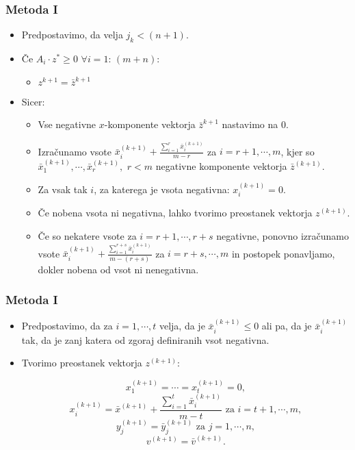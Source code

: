 \documentclass{beamer}
\theoremstyle{definition}
\theoremstyle{plain}
\begin{document}
\begin{frame}
\frametitle{Metoda I}
     \begin{itemize}
        \item Predpostavimo, da velja  $j_k < (n +1)$.
        \item Če $A_i \cdot z^* \geq 0 \, \, \forall i = 1: \, (m+n)$:
        \begin{itemize}
            \item $z^{k+1} = \bar{z}^{k+1}$
        \end{itemize}
        \item Sicer:
        \begin{itemize}
           \item Vse negativne $x$-komponente vektorja $\bar{z}^{k+1}$ nastavimo na 0.
           \item Izračunamo vsote  $\bar{x}_i^{(k+1)} + \frac{\sum_{i=1}^r \bar{x}_i^{(k+1)}}{m - r} $ za $i = r +1, \cdots, m$, kjer 
           so $\bar{x}_1^{(k+1)}, \cdots, \bar{x}_r^{(k+1)}, \, \, r < m$ negativne komponente vektorja $\bar{z}^{(k+1)}$.
           \item Za vsak tak $i$, za katerega
           je vsota negativna: $x_i^{(k+1)} = 0$.
           \item Če nobena vsota ni negativna, lahko tvorimo preostanek vektorja $z^{(k+1)}$.
           \item Če so nekatere vsote za $i = r+1, \cdots, r +s$ negativne, ponovno izračunamo vsote 
           $\bar{x}_i^{(k+1)} + \frac{\sum_{i=1}^{r+s} \bar{x}_i^{(k+1)}}{m - (r+s)} $ za $i = r + s, \cdots, m$ in postopek ponavljamo, dokler nobena od vsot ni nenegativna.
        \end{itemize}
    \end{itemize}
\end{frame}
\begin{frame}
\frametitle{Metoda I}
    \begin{itemize}
        \item Predpostavimo, da za $i = 1, \cdots, t$ velja, da je $\bar{x}_i^{(k+1)} \leq 0$ ali pa, da je $\bar{x}_i^{(k+1)}$ tak, da je zanj katera od zgoraj definiranih vsot negativna. 
        \item Tvorimo preostanek vektorja $z^{(k+1)}$:

    \begin{equation*}
        x_1^{(k+1)} = \cdots = x_t^{(k+1)} = 0,
    \end{equation*}  
    \begin{equation*}
        x_i^{(k+1)} = \bar{x}^{(k+1)} +  \frac{\sum_{i=1}^{t}\bar{x}_i^{(k+1)}}{m-t} \, \, \text{za} \, \, i = t+1, \cdots, m,
    \end{equation*}
    \begin{equation*}
        y_j^{(k+1)} = \bar{y}_j^{(k+1)} \, \, \text{za} \, \, j = 1, \cdots, n,
    \end{equation*}
    \begin{equation*}
        v^{(k+1)} = \bar{v}^{(k+1)}.
    \end{equation*}
    
\end{itemize}
\end{frame}
\end{document}
